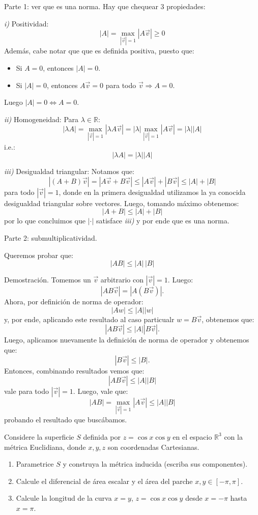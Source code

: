 \documentclass[11pt,spanish]{article}
\newcounter{problema}
\newcommand{\prob}{\stepcounter{problema} \vspace{.5cm} \noindent{\bf Problema \arabic{problema}: }}
\begin{document}
\vspace{0.5cm}

Parte 1: ver que es una norma.
Hay que chequear 3 propiedades:

{\em i)} Positividad:
$$
|A| = \max_{|\vec v|=1} |A\vec v| \ge 0
$$
Además, cabe notar que que es definida positiva, puesto que:
\begin{itemize}
\item Si $A = 0$, entonces $|A| = 0$.
\item Si $|A| = 0$, entonces $A\vec v = 0$ para todo $\vec v \Rightarrow A = 0$.
\end{itemize}
Luego $|A|=0 \Leftrightarrow A=0$.

{\em ii)} Homogeneidad:
Para $\lambda \in \mathbb{R}$:
$$
|\lambda A| = \max_{|\vec v|=1} |\lambda A \vec v| = |\lambda| \max_{|\vec v|=1} |A\vec v| = |\lambda| |A|
$$
i.e.:
$$
\boxed{|\lambda A| = |\lambda| |A|}
$$

{\em iii)} Desigualdad triangular:
Notamos que:
$$
|(A+B)\vec v| = |A\vec v +B\vec v| \leq |A\vec v|+|B\vec v| \le |A| + |B|
$$
para todo $|\vec v|=1$, donde en la primera desigualdad utilizamos la ya conocida desigualdad triangular sobre vectores.
Luego, tomando máximo obtenemos:
$$
|A+B| \le |A| + |B|
$$
por lo que concluimos que $\boxed{|\cdot|}$ satisface {\em iii)} y por ende que es una norma.

\vspace{0.5cm}

Parte 2: submultiplicatividad.

Queremos probar que:
$$
|AB| \le |A|\,|B|
$$

Demostración.
Tomemos un $\vec v$ arbitrario con $|\vec v| = 1$.
Luego:
$$
|AB\vec v| = |A(B\vec v)|
.
$$
Ahora, por definición de norma de operador:
$$
|A w| \le |A| |w|
$$
y, por ende, aplicando este resultado al caso particualr $w = B\vec v$, obtenemos que:
$$
|AB\vec v| \le |A| |B\vec v|
.
$$
Luego, aplicamos nuevamente la definici\'on de norma de operador y obtenemos que:
$$
|B\vec v| \le |B|
.
$$
Entonces, combinando resultados vemos que:
$$
|AB\vec v| \le |A| |B|
$$
vale para todo $|\vec v| = 1$.
Luego, vale que:
$$
\boxed{|AB| = \max_{|\vec v|=1} |A\vec v| \le |A| |B|}
$$
probando el resultado que busc\'abamos.


\prob Considere la superficie \(S\) definida por \(z = \cos x \cos y\) en el espacio \(\mathbb{R}^3\) con la m\'etrica Euclidiana, donde \(x,y,z\) son coordenadas Cartesianas.
\begin{enumerate}
    \item Parametrice \(S\) y construya la métrica inducida (escriba sus componentes).
    \item Calcule el diferencial de área escalar y el área del parche \(x,y \in [-\pi, \pi]\).
    \item Calcule la longitud de la curva \(x = y\), \(z = \cos x \cos y\) desde \(x = -\pi\) hasta \(x = \pi\).
\end{enumerate}
\end{document}
